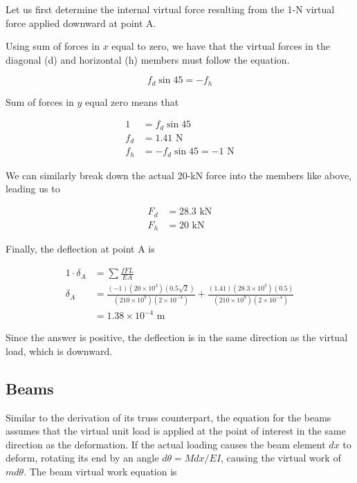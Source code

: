 \documentclass[
10pt,
a4paper,
openany,
svgnames,
]{book} %
\begin{document}
\begin{solution}
  Let us first determine the internal virtual force resulting from the 1-N virtual force applied downward at point A.
  
  Using sum of forces in $x$ equal to zero, we have that the virtual forces in the diagonal (d) and horizontal (h) members must follow the equation.
  
  \begin{equation*}
    f_d \sin 45 = -f_h
  \end{equation*}
  
  Sum of forces in $y$ equal zero means that
  
  \begin{align*}
    1 &= f_d \sin 45 \\
    f_d &= 1.41 \text{ N} \\
    f_h &= -f_d \sin 45 = -1 \text{ N}
  \end{align*}

  We can similarly break down the actual 20-kN force into the members like above, leading us to
  
  \begin{align*}
    F_d &= 28.3 \text{ kN} \\
    F_h &= 20 \text{ kN}
  \end{align*}

  Finally, the deflection at point A is

  \begin{align*}
    1 \cdot \delta_A &= \sum \frac{fFL}{EA} \\
    \delta_A &= \frac{(-1)(20 \times 10^3)(0.5\sqrt{2})}{(210 \times 10^9)(2 \times 10^{-4})} + \frac{(1.41)(28.3 \times 10^3)(0.5)}{(210 \times 10^9)(2 \times 10^{-4})} \\
                     &= 1.38 \times 10^{-4} \text{ m}
  \end{align*}

  Since the answer is positive, the deflection is in the same direction as the virtual load, which is downward.
  
\end{solution}

\subsection{Beams}

Similar to the derivation of its truss counterpart, the equation for the beams assumes that the virtual unit load is applied at the point of interest in the same direction as the deformation. If the actual loading causes the beam element $dx$ to deform, rotating its end by an angle $d\theta = M dx / EI$, causing the virtual work of $m d\theta$. The beam virtual work equation is
\end{document}
